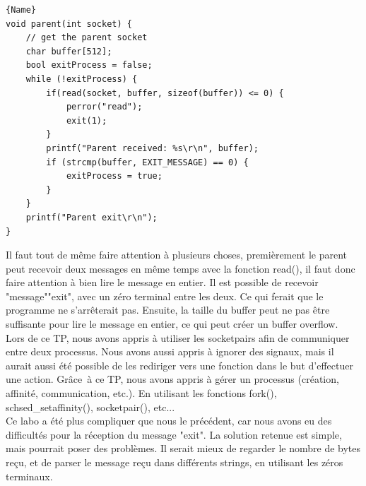 \documentclass[
	a4paper, %
	10pt, %
]{CSUniSchoolLabReport}
\begin{document}
\begin{minipage}{.45\textwidth}
\begin{lstlisting}[style=CStyle, caption=Processus Parent, firstnumber=1]{Name}
void parent(int socket) {
	// get the parent socket
	char buffer[512];
	bool exitProcess = false;
	while (!exitProcess) {
		if(read(socket, buffer, sizeof(buffer)) <= 0) {
			perror("read");
			exit(1);
		}
		printf("Parent received: %s\r\n", buffer);
		if (strcmp(buffer, EXIT_MESSAGE) == 0) {
			exitProcess = true;
		}
	}
	printf("Parent exit\r\n");
}
\end{lstlisting}
\end{minipage}
Il faut tout de m\^eme faire attention \`a plusieurs choses, premi\`erement le parent peut recevoir deux messages en m\^eme temps avec la fonction read(), il faut donc faire attention à bien lire le message en entier.
Il est possible de recevoir "message""exit", avec un z\'ero terminal entre les deux. Ce qui ferait que le programme ne s'arr\^eterait pas.
Ensuite, la taille du buffer peut ne pas \^etre suffisante pour lire le message en entier, ce qui peut créer un buffer overflow.\\

Lors de ce TP, nous avons appris \`a utiliser les socketpairs afin de communiquer entre deux processus.
Nous avons aussi appris \`a ignorer des signaux, mais il aurait aussi été possible de les rediriger vers une fonction dans le but d'effectuer une action.
Gr\^ace\ \`a ce TP, nous avons appris \`a g\'erer un processus (création, affinité, communication, etc.). En utilisant les fonctions fork(), schsed\_setaffinity(), socketpair(), etc...\\

Ce labo a été plus compliquer que nous le pr\'ec\'edent, car nous avons eu des difficultés pour la r\'eception du message "exit". La solution retenue est simple, mais pourrait poser des probl\`emes.
Il serait mieux de regarder le nombre de bytes re\c{c}u, et de parser le message re\c{c}u dans diff\'erents strings, en utilisant les z\'eros terminaux.

\newpage
\end{document}
